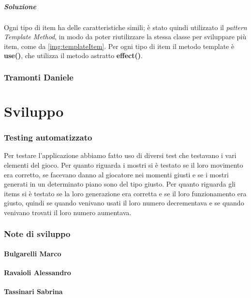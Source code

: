\documentclass{report}
\begin{document}
\paragraph{Soluzione} Ogni tipo di item ha delle caratteristiche simili; è stato quindi utilizzato il \textit{pattern Template Method}, in modo da poter riutilizzare la stessa classe per sviluppare più item, come da \ref{img:templateItem}.
%
Per ogni tipo di item il metodo template è \textbf{use()}, che utilizza il metodo astratto \textbf{effect()}. 

\subsection{Tramonti Daniele}

\chapter{Sviluppo}

\subsection{Testing automatizzato}
Per testare l'applicazione abbiamo fatto uso di diversi test che testavano i vari elementi del gioco. 
%
Per quanto riguarda i mostri si è testato se il loro movimento era corretto, se facevano danno al giocatore nei momenti giusti e se i mostri generati in un determinato piano sono del tipo giusto.
%
Per quanto riguarda gli items si è testato se la loro generazione era corretta e se il loro funzionamento era giusto, quindi se quando venivano usati il loro numero decrementava e se quando venivano trovati il loro numero aumentava.
%

\subsection{Note di sviluppo}

\subsubsection{Bulgarelli Marco}

\subsubsection{Ravaioli Alessandro}

\subsubsection{Tassinari Sabrina}
\end{document}
